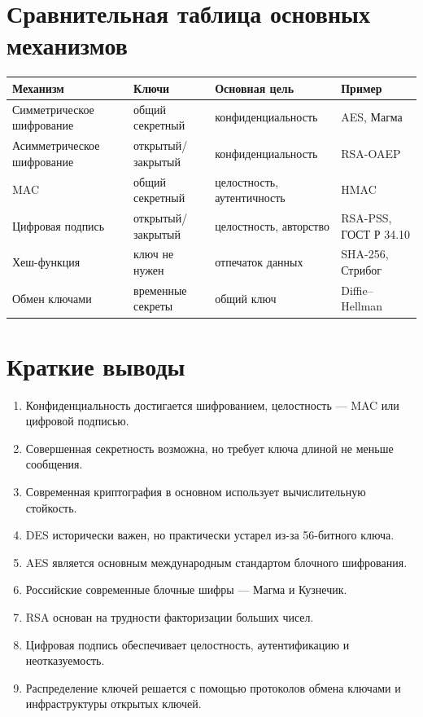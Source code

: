 \documentclass[12pt,a4paper]{article}
\begin{document}
\section{Сравнительная таблица основных механизмов}

\begin{center}
\begin{tabular}{llll}
\toprule
Механизм & Ключи & Основная цель & Пример \\
\midrule
Симметрическое шифрование & общий секретный & конфиденциальность & AES, Магма \\
Асимметрическое шифрование & открытый/закрытый & конфиденциальность & RSA-OAEP \\
MAC & общий секретный & целостность, аутентичность & HMAC \\
Цифровая подпись & открытый/закрытый & целостность, авторство & RSA-PSS, ГОСТ Р 34.10 \\
Хеш-функция & ключ не нужен & отпечаток данных & SHA-256, Стрибог \\
Обмен ключами & временные секреты & общий ключ & Diffie--Hellman \\
\bottomrule
\end{tabular}
\end{center}

\section{Краткие выводы}

\begin{enumerate}
    \item Конфиденциальность достигается шифрованием, целостность --- MAC или цифровой подписью.
    \item Совершенная секретность возможна, но требует ключа длиной не меньше сообщения.
    \item Современная криптография в основном использует вычислительную стойкость.
    \item DES исторически важен, но практически устарел из-за 56-битного ключа.
    \item AES является основным международным стандартом блочного шифрования.
    \item Российские современные блочные шифры --- Магма и Кузнечик.
    \item RSA основан на трудности факторизации больших чисел.
    \item Цифровая подпись обеспечивает целостность, аутентификацию и неотказуемость.
    \item Распределение ключей решается с помощью протоколов обмена ключами и инфраструктуры открытых ключей.
\end{enumerate}
\end{document}

